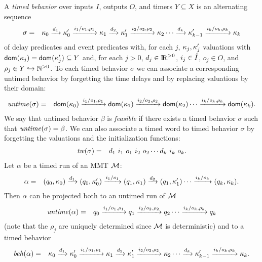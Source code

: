 A \emph{timed behavior} over inputs $I$, outputs $O$, and timers $Y \subseteq X$ is an alternating sequence
\begin{eqnarray*}
\sigma & = & \kappa_0 \xrightarrow{d_1} \kappa'_0 \xrightarrow{i_1/o_1, \rho_1} \kappa_1 \xrightarrow{d_2} \kappa'_1 \xrightarrow{i_2/o_2, \rho_2} \kappa_2 \cdots
\xrightarrow{d_k} \kappa'_{k-1} \xrightarrow{i_k/o_k, \rho_k} \kappa_{k}
\end{eqnarray*}
of delay predicates and event predicates with, for each $j$,
$\kappa_j, \kappa'_j$ valuations
with ${\textsf{dom}}(\kappa_j) = {\textsf{dom}}(\kappa'_j) \subseteq Y$ and,
for each $j>0$,  $d_j \in {\rm I\!R}^{> 0}$, $i_j \in \hat{I}$, $o_j \in O$, and $\rho_j \in Y \hookrightarrow {\mathbb N}^{>0}$.
To each timed behavior $\sigma$ we can associate a corresponding untimed behavior by forgetting the time
delays and by replacing valuations by their domain:
\begin{eqnarray*}
\mathit{untime}(\sigma) & = & {\textsf{dom}}(\kappa_0) \xrightarrow{i_1/o_1, \rho_1} {\textsf{dom}}(\kappa_1)  \xrightarrow{i_2/o_2, \rho_2} {\textsf{dom}}(\kappa_2) \cdots \xrightarrow{i_k/o_k, \rho_k} {\textsf{dom}}(\kappa_k).
\end{eqnarray*}
We say that untimed behavior $\beta$ is \emph{feasible} if there exists a timed behavior $\sigma$ such that $\mathit{untime}(\sigma) = \beta$.
We can also associate a timed word to timed behavior $\sigma$ by forgetting the valuations and the initialization functions:
\begin{eqnarray*}
\mathit{tw}(\sigma) & = & d_ 1 ~ i_1 ~ o_1 ~ i_2 ~ o_2 \cdots d_k ~ i_k ~ o_k.
\end{eqnarray*} 
Let $\alpha$ be a timed run of an MMT ${\cal M}$: 
\begin{eqnarray*}
\alpha & = & (q_0, \kappa_0) \xrightarrow{d_1} (q_0, \kappa'_0) \xrightarrow{i_1/o_1} (q_1, \kappa_1) \xrightarrow{d_2} (q_1, \kappa'_1)  \cdots
 \xrightarrow{i_k/o_k} (q_k, \kappa_k).
\end{eqnarray*}
Then $\alpha$ can be projected both to an untimed run of ${\cal M}$
\begin{eqnarray*}
\mathit{untime} (\alpha) & = & q_0 \xrightarrow{i_1/o_1, \rho_1} q_1  \xrightarrow{i_2/o_2, \rho_2} q_2 \cdots \xrightarrow{i_k/o_k, \rho_k} q_k
\end{eqnarray*}
(note that the $\rho_j$ are uniquely determined since ${\cal M}$ is deterministic) and to a timed behavior
\begin{eqnarray*}
\mathit{beh}(\alpha) & = & \kappa_0 \xrightarrow{d_1} \kappa'_0 \xrightarrow{i_1/o_1, \rho_1} \kappa_1 \xrightarrow{d_2} \kappa'_1 \xrightarrow{i_2/o_2, \rho_2} \kappa_2 \cdots
\xrightarrow{d_k} \kappa'_{k-1} \xrightarrow{i_k/o_k, \rho_k} \kappa_{k}.
\end{eqnarray*}
